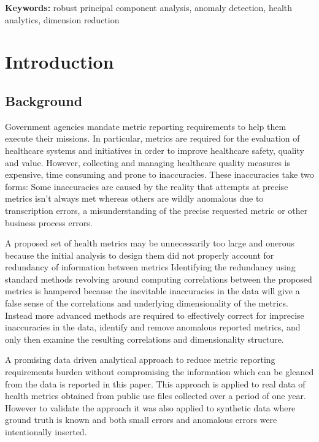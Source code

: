 \documentclass[conference]{IEEEtran}
\begin{document}
{\bf Keywords:} robust principal component analysis, anomaly
detection, health analytics, dimension reduction

\section{Introduction}

\subsection{Background}
Government agencies  mandate  metric reporting requirements to help them execute their missions.  In particular,  metrics are required for the evaluation of healthcare systems and initiatives in order to improve healthcare safety, quality and value. However, collecting and managing healthcare quality measures is expensive,  time consuming and prone to inaccuracies. These inaccuracies take two forms: Some inaccuracies are caused by the reality that attempts at precise metrics isn't always met whereas others  are wildly anomalous due to transcription errors, a misunderstanding of the precise requested metric or other business process errors.

A  proposed set of health metrics may be unnecessarily too large and onerous because the initial analysis to design them did not properly account for redundancy of information between metrics
Identifying the redundancy  using standard methods revolving around computing correlations between the proposed metrics is hampered because the inevitable inaccuracies in the data will give a false sense of the correlations and underlying dimensionality of the metrics.   Instead more advanced methods are required to effectively correct for imprecise inaccuracies in the data, identify and remove anomalous reported metrics, and only then examine the resulting correlations and dimensionality structure.

A promising data driven analytical approach to reduce metric reporting requirements burden without compromising the information which can be gleaned from the data is reported in this paper. This approach is applied to real data of  health metrics obtained from public use files  collected over a period of one year.  However to validate the approach it was also applied  to synthetic  data where ground truth is known and both small errors and anomalous errors were  intentionally inserted.
\end{document}
